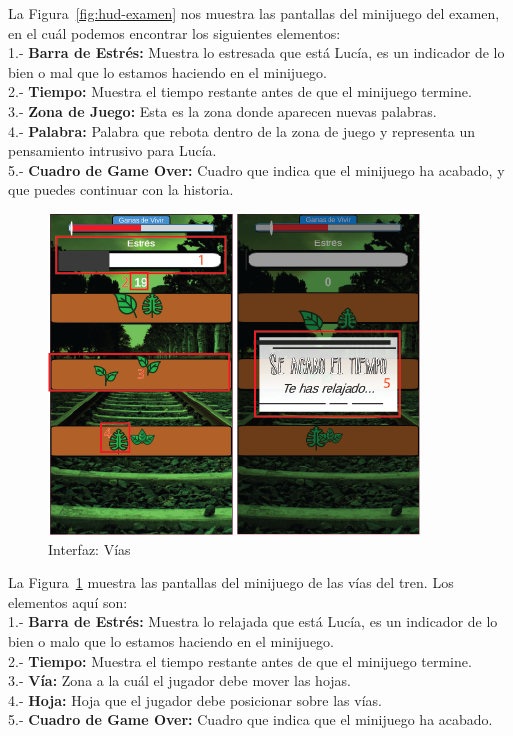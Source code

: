La Figura~\ref{fig:hud-examen} nos muestra las pantallas del minijuego del examen, en el cuál podemos encontrar los siguientes elementos:\\
1.- \textbf{Barra de Estrés:} Muestra lo estresada que está Lucía, es un indicador de lo bien o mal que lo estamos haciendo en el minijuego.\\
2.- \textbf{Tiempo:} Muestra el tiempo restante antes de que el minijuego termine.\\
3.- \textbf{Zona de Juego:} Esta es la zona donde aparecen nuevas palabras.\\
4.- \textbf{Palabra:} Palabra que rebota dentro de la zona de juego y representa un pensamiento intrusivo para Lucía.\\
5.- \textbf{Cuadro de Game Over:} Cuadro que indica que el minijuego ha acabado, y que puedes continuar con la historia.

\newpage
\begin{figure}[ht]
    \centering
    \includegraphics{imgs/hud-vias.png}
    \caption{Interfaz: Vías}
    \label{fig:hud-vias}
\end{figure}

La Figura~\ref{fig:hud-vias} muestra las pantallas del minijuego de las vías del tren. Los elementos aquí son:\\
1.- \textbf{Barra de Estrés:} Muestra lo relajada que está Lucía, es un indicador de lo bien o malo que lo estamos haciendo en el minijuego.\\
2.- \textbf{Tiempo:} Muestra el tiempo restante antes de que el minijuego termine.\\
3.- \textbf{Vía:} Zona a la cuál el jugador debe mover las hojas.\\
4.- \textbf{Hoja:} Hoja que el jugador debe posicionar sobre las vías.\\
5.- \textbf{Cuadro de Game Over:} Cuadro que indica que el minijuego ha acabado.

